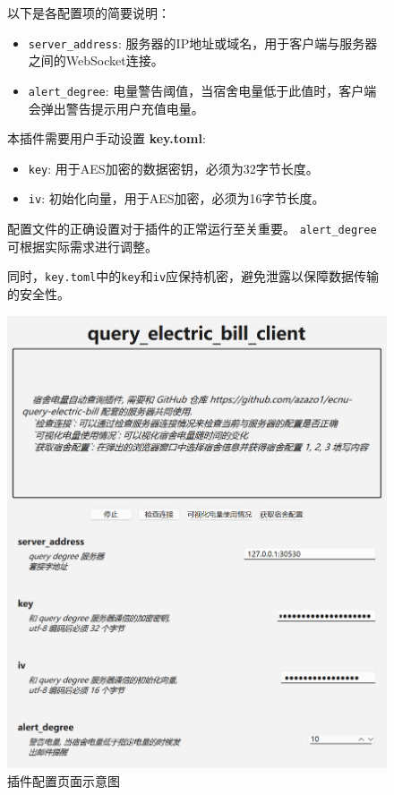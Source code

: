 \documentclass[14pt,a4paper,UTF8,twoside]{article}
\begin{document}
\begin{figure}[H]
    \centering
    \begin{minipage}[H]{0.45\textwidth}
        以下是各配置项的简要说明：

        \begin{itemize}
            \item \texttt{server\_address}: 服务器的IP地址或域名，用于客户端与服务器之间的WebSocket连接。
            \item \texttt{alert\_degree}: 电量警告阈值，当宿舍电量低于此值时，客户端会弹出警告提示用户充值电量。
        \end{itemize}
        
        本插件需要用户手动设置 \textbf{key.toml}:

        \begin{itemize}
            \item \texttt{key}: 用于AES加密的数据密钥，必须为32字节长度。
            \item \texttt{iv}: 初始化向量，用于AES加密，必须为16字节长度。
        \end{itemize}

        配置文件的正确设置对于插件的正常运行至关重要。
        \texttt{alert\_degree} 可根据实际需求进行调整。

        同时，\texttt{key.toml}中的\texttt{key}和\texttt{iv}应保持机密，避免泄露以保障数据传输的安全性。
    \end{minipage}
    \hfill
    \begin{minipage}[H]{0.5\textwidth}
        \centering
        \includegraphics[width=\linewidth]{img/electric_bill_config.png}
        \caption{插件配置页面示意图}
        \label{fig:config_page}
    \end{minipage}
\end{figure}
\end{document}
